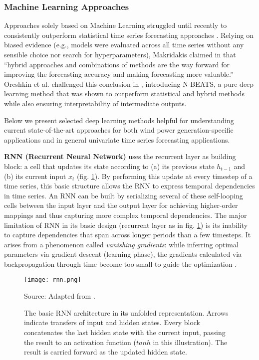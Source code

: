 \pagebreak
\subsubsection{Machine Learning Approaches}\label{subsubsec:ml_methods}

Approaches solely based on Machine Learning struggled until recently to consistently outperform statistical time series forecasting approaches \cite{makridakis2018m4}.
Relying on biased evidence (e.g., models were evaluated across all time series without any sensible choice nor search for hyperparameters), Makridakis claimed in \cite{makridakis2018m4} that ``hybrid approaches and combinations of methods are the way forward for improving the forecasting accuracy and making forecasting more valuable.''
Oreshkin et al. challenged this conclusion in \cite{oreshkin2019nbeats}, introducing N-BEATS, a pure deep learning method that was shown to outperform statistical and hybrid methods while also ensuring interpretability of intermediate outputs.

Below we present selected deep learning methods helpful for understanding current state-of-the-art approaches for both wind power generation-specific applications and in general univariate time series forecasting applications.

\vspace{1em}
\noindent
\textbf{RNN (Recurrent Neural Network)} uses the recurrent layer as building block: a cell that updates its state according to (a) its previous state $h_{t-1}$ and (b) its current input $x_t$ (fig. \ref{fig:rnn}). By performing this update at every timestep of a time series, this basic structure allows the RNN to express temporal dependencies in time series. An RNN can be built by serializing several of these self-looping cells between the input layer and the output layer for achieving higher-order mappings and thus capturing more complex temporal dependencies.
The major limitation of RNN in its basic design (recurrent layer as in fig. \ref{fig:rnn}) is its inability to capture dependencies that span across longer periods than a few timesteps.
It arises from a phenomenon called \textit{vanishing gradients}: while inferring optimal parameters via gradient descent (learning phase), the gradients calculated via backpropagation through time become too small to guide the optimization \cite{paneru2015lstm}.
\begin{figure}[H]
   \centering
    \caption{The basic RNN architecture in its unfolded representation. Arrows indicate transfers of input and hidden states. Every block concatenates the last hidden state with the current input, passing the result to an activation function ($tanh$ in this illustration). The result is carried forward as the updated hidden state.}
    \texttt{[image: rnn.png]}  \\
    \raggedright
    Source: Adapted from \cite{paneru2015lstm}.
   \label{fig:rnn}
\end{figure}


